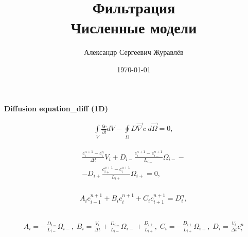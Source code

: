\documentclass[a4paper,12pt,russian]{extreport}
\author{Александр Сергеевич Журавлёв}
\title{Фильтрация\\Численные модели}
\date{\today}
\begin{document}
\pagecolor{pageColor}
\color{fontColor}
\Russian
\printnomenclature[5em]

\begin{center}
{\large \textbf{Diffusion equation_diff (1D)}}
\end{center}

\begin{eqnarray}
\label{eq:phys_D}
\int \limits_{V} \frac{\partial c}{\partial t} d V - \oint \limits_{\Omega} D \vec{\nabla}c \; d\vec{\Omega} = 0,
\end{eqnarray}

\begin{eqnarray}
\label{eq:num_D}
\begin{gathered}
\frac{c^{n+1}_{i} - c^{n}_{i}}{\Delta t} V_{i} +D_{i-}\frac{c^{n+1}_{i} - c^{n+1}_{i-}}{L_{i-}} \Omega_{i-} - \\
- D_{i+}\frac{c^{n+1}_{i+} - c^{n+1}_{i}}{L_{i+}} \Omega_{i+} = 0,
\end{gathered}
\end{eqnarray}

\begin{eqnarray}
\begin{gathered}
\label{eq:B_coeff}
A_i c_{i-1}^{n+1} + B_i c_{i}^{n+1} + C_i c_{i+1}^{n+1} = D_{i}^n, \\
\end{gathered}
\end{eqnarray}

\begin{eqnarray}
\begin{gathered}
\label{eq:coeff}
A_i = - \frac{D_{i-}}{L_{i-}} \Omega_{i-}, \;
B_i = \frac{V_{i}}{\Delta t} + \frac{D_{i-}}{L_{i-}} \Omega_{i-} + \frac{D_{i+}}{L_{i+}}, \;
C_i = - \frac{D_{i+}}{L_{i+}} \Omega_{i+}, \; 
D_i = \frac{V_{i}}{\Delta t} c_{i}^n
\end{gathered}
\end{eqnarray}
\end{document}
